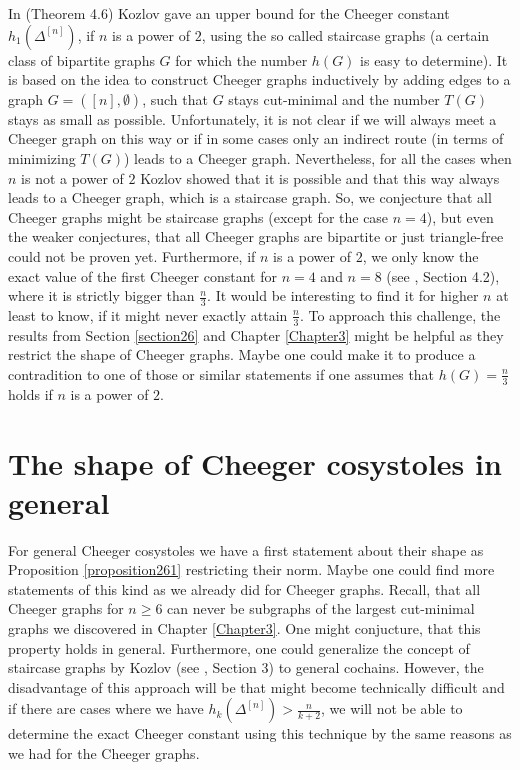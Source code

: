 In \cite{1} (Theorem 4.6) Kozlov gave an upper bound for the Cheeger constant \(h_1(\Delta^{[n]})\), if \(n\) is a power of \(2\), using the so called staircase graphs (a certain class of bipartite graphs \(G\) for which the number \(h(G)\) is easy to determine). It is based on the idea to construct Cheeger graphs inductively by adding edges to a graph \(G=([n],\emptyset)\), such that \(G\) stays cut-minimal and the number \(T(G)\) stays as small as possible. Unfortunately, it is not clear if we will always meet a Cheeger graph on this way or if in some cases only an indirect route (in terms of minimizing \(T(G)\)) leads to a Cheeger graph. Nevertheless, for all the cases when \(n\) is not a power of \(2\) Kozlov showed that it is possible and that this way always leads to a Cheeger graph, which is a staircase graph. So, we conjecture that all Cheeger graphs might be staircase graphs (except for the case \(n=4\)), but even the weaker conjectures, that all Cheeger graphs are bipartite or just triangle-free could not be proven yet. Furthermore, if \(n\) is a power of \(2\), we only know the exact value of the first Cheeger constant for \(n=4\) and \(n=8\) (see \cite{1}, Section 4.2), where it is strictly bigger than \(\frac{n}{3}\). It would be interesting to find it for higher \(n\) at least to know, if it might never exactly attain \(\frac{n}{3}\). To approach this challenge, the results from Section \ref{section26} and Chapter \ref{Chapter3} might be helpful as they restrict the shape of Cheeger graphs. Maybe one could make it to produce a contradition to one of those or similar statements if one assumes that \(h(G)=\frac{n}{3}\) holds if \(n\) is a power of \(2\).

\section{The shape of Cheeger cosystoles in general}

For general Cheeger cosystoles we have a first statement about their shape as Proposition \ref{proposition261} restricting their norm. Maybe one could find more statements of this kind as we already did for Cheeger graphs. Recall, that all Cheeger graphs for \(n\geq 6\) can never be subgraphs of the largest cut-minimal graphs we discovered in Chapter \ref{Chapter3}. One might conjucture, that this property holds in general. Furthermore, one could generalize the concept of staircase graphs by Kozlov (see \cite{1}, Section 3) to general cochains. However, the disadvantage of this approach will be that might become technically difficult and if there are cases where we have \(h_k(\Delta^{[n]})>\frac{n}{k+2}\), we will not be able to determine the exact Cheeger constant using this technique by the same reasons as we had for the Cheeger graphs.

